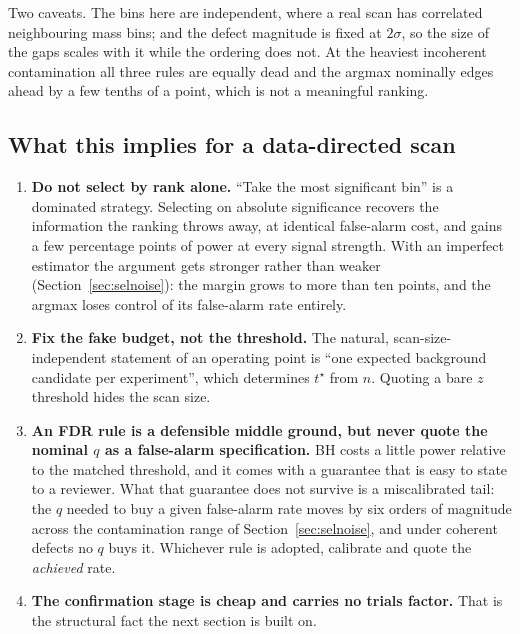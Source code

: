 Two caveats. The bins here are independent, where a real scan has correlated neighbouring mass
bins; and the defect magnitude is fixed at $2\sigma$, so the size of the gaps scales with it while
the ordering does not. At the heaviest incoherent contamination all three rules are equally dead
and the argmax nominally edges ahead by a few tenths of a point, which is not a meaningful
ranking.

\subsection{What this implies for a data-directed scan}

\begin{enumerate}[leftmargin=1.6em,itemsep=3pt]
  \item \textbf{Do not select by rank alone.} ``Take the most significant bin'' is a dominated
strategy. Selecting on absolute significance recovers the information the ranking throws away, at
identical false-alarm cost, and gains a few percentage points of power at every signal strength.
With an imperfect estimator the argument gets stronger rather than weaker
(Section~\ref{sec:selnoise}): the margin grows to more than ten points, and the argmax loses
control of its false-alarm rate entirely.
  \item \textbf{Fix the fake budget, not the threshold.} The natural, scan-size-independent
        statement of an operating point is ``one expected background candidate per experiment'',
        which determines $t^\star$ from $n$. Quoting a bare $z$ threshold hides the scan size.
  \item \textbf{An FDR rule is a defensible middle ground, but never quote the nominal $q$ as a
false-alarm specification.} BH costs a little power relative to the matched threshold, and it
comes with a guarantee that is easy to state to a reviewer. What that guarantee does not survive
is a miscalibrated tail: the $q$ needed to buy a given false-alarm rate moves by six orders of
magnitude across the contamination range of Section~\ref{sec:selnoise}, and under coherent defects
no $q$ buys it. Whichever rule is adopted, calibrate and quote the \emph{achieved} rate.
  \item \textbf{The confirmation stage is cheap and carries no trials factor.} That is the
        structural fact the next section is built on.
\end{enumerate}
